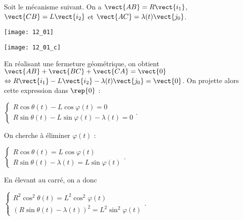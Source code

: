\normaltrue \difficilefalse \tdifficilefalse
\correctiontrue


\setcounter{question}{0}
\ifcorrection
\else
{}
\fi

\ifprof
\else
Soit le mécanisme suivant. On a $\vect{AB}=R\vect{i_1}$, $\vect{CB}=L\vect{i_2}$ et $\vect{AC}=\lambda(t) \vect{j_0}$. 

\begin{center}
\texttt{[image: 12\_01]}
\end{center}
\fi


\ifprof
\begin{center}
\texttt{[image: 12\_01\_c]}
\end{center}
\else
\fi


\ifprof
En réalisant une fermeture géométrique, on obtient 
$\vect{AB}+\vect{BC}+\vect{CA}=\vect{0}$ 
$ \Leftrightarrow R\vect{i_1} - L\vect{i_2} - \lambda(t) \vect{j_0} = \vect{0}$.
On projette alors cette expression dans $\rep{0}$ : 

$
\left\{
\begin{array}{l}
R\cos\theta(t)- L\cos\varphi(t) = 0 \\
R\sin\theta(t) - L\sin\varphi(t) - \lambda(t) = 0 
\end{array}
\right.
$.

On cherche à éliminer $\varphi(t)$ : 

$
\left\{
\begin{array}{l}
R\cos\theta(t) = L\cos\varphi(t)  \\
R\sin\theta(t)  - \lambda(t) = L\sin\varphi(t)
\end{array}
\right.
$.

En élevant au carré, on a donc 

$\left\{
\begin{array}{l}
R^2\cos^2\theta(t) = L^2\cos^2\varphi(t)  \\
\left(R\sin\theta(t)  - \lambda(t)\right)^2 = L^2\sin^2\varphi(t)
\end{array}
\right.
$.

